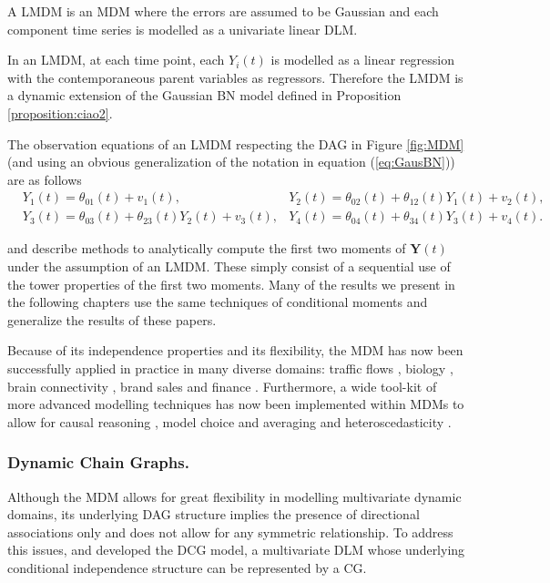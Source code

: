 \begin{definition}
A \gls{LMDM} is an \gls{MDM} where the errors are assumed to be Gaussian and each component time series is modelled as a univariate linear \gls{DLM}.
\end{definition}
In an \gls{LMDM}, at each time point, each $Y_i(t)$ is modelled as a linear regression with the contemporaneous parent variables as regressors. Therefore the \gls{LMDM} is a dynamic extension of the Gaussian \gls{BN} model defined in Proposition \ref{proposition:ciao2}. 

\begin{example}
The observation equations of an \gls{LMDM} respecting the \gls{DAG} in Figure \ref{fig:MDM} (and using an obvious generalization of the notation in equation (\ref{eq:GausBN})) are as follows
\begin{align}
&Y_1(t)=\theta_{01}(t)+v_1(t), &Y_2(t)=\theta_{02}(t)+\theta_{12}(t)Y_1(t)+v_2(t),\nonumber\\
&Y_3(t)=\theta_{03}(t)+\theta_{23}(t)Y_2(t)+v_3(t),&Y_4(t)=\theta_{04}(t)+\theta_{34}(t)Y_3(t)+v_4(t).\nonumber
\end{align}
\end{example}
\citet{Queen1993} and \citet{Queen2008} describe methods to analytically compute the first two moments of $\bm{Y}(t)$ under the assumption of an \gls{LMDM}. These simply consist of a sequential use of the tower properties of the first two moments. Many of the results we present in the following chapters use the same techniques of conditional moments and generalize the results of these papers. 

Because of its independence properties and its flexibility, the \gls{MDM} has now been successfully applied in practice in many diverse domains: traffic flows \citep{Anacleto2013}, biology \citep{Oates2013}, brain connectivity \citep{Costa2013}, brand sales \citep{Queen1994} and finance \citep{Zhao2015}. Furthermore, a wide tool-kit of more advanced modelling techniques has now been implemented within \glspl{MDM} to allow for causal reasoning \citep{Queen2009}, model choice and averaging \citep{Costa2013,Zhao2015} and heteroscedasticity \citep{Anacleto2013}. 

\subsubsection{Dynamic Chain Graphs.}
\label{sec:DCG}
Although the \gls{MDM} allows for great flexibility in modelling multivariate dynamic domains, its underlying \gls{DAG} structure implies the presence of directional associations only and does not allow for any symmetric relationship. To address this issues, \citet{Queen1992} and \citet{Anacleto2013c} developed the \gls{DCG} model, a multivariate \gls{DLM} whose underlying conditional independence structure can be represented by a \gls{CG}. 

